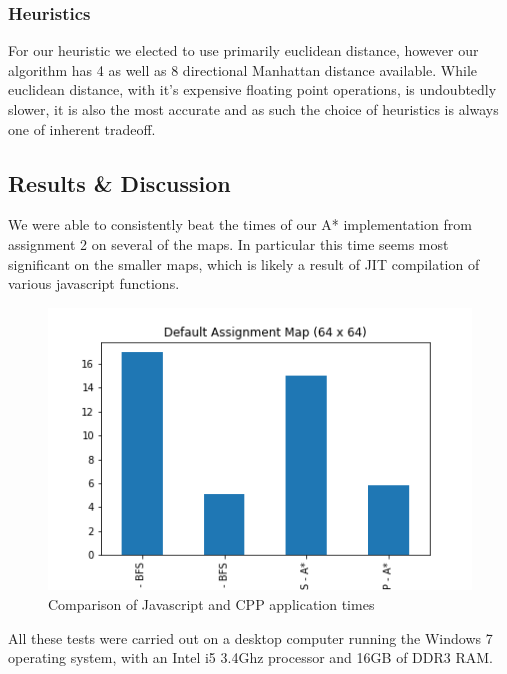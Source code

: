 \documentclass{article}
\begin{document}
\subsubsection*{Heuristics}
For our heuristic we elected to use primarily euclidean distance, however our algorithm has 4 as well as 8 directional Manhattan distance available. While euclidean distance, with it's expensive floating point operations, is undoubtedly slower, it is also the most accurate and as such the choice of heuristics is always one of inherent tradeoff.

\subsection*{Results \& Discussion}
We were able to consistently beat the times of our A* implementation from assignment 2 on several of the maps. In particular this time seems most significant on the smaller maps, which is likely a result of JIT compilation of various javascript functions.
\begin{figure}[h!]
\includegraphics[width=\textwidth]{defaultMap}
\caption{Comparison of Javascript and CPP application times}
\end{figure}

All these tests were carried out on a desktop computer running the Windows 7 operating system, with an Intel i5 3.4Ghz processor and 16GB of DDR3 RAM.
\end{document}
